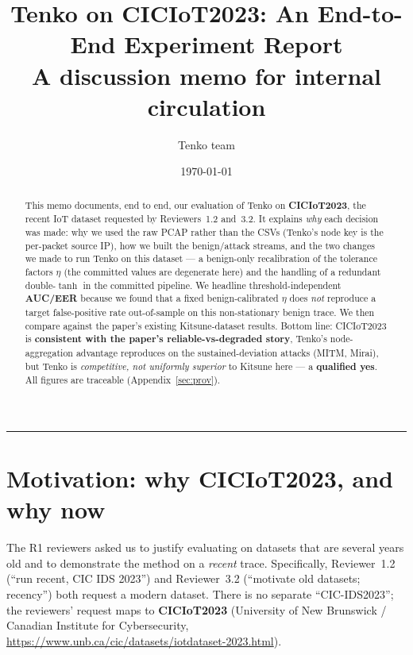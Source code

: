 \documentclass[11pt]{article}
\title{Tenko on CICIoT2023: An End-to-End Experiment Report\\
\large A discussion memo for internal circulation}
\author{Tenko team}
\date{\today}
\begin{document}
\maketitle
\sloppy

\begin{abstract}
This memo documents, end to end, our evaluation of Tenko on \textbf{CICIoT2023}, the
recent IoT dataset requested by Reviewers~1.2 and~3.2. It explains \emph{why} each decision
was made: why we used the raw PCAP rather than the CSVs (Tenko's node key is the per-packet
source IP), how we built the benign/attack streams, and the two changes we made to run Tenko on
this dataset --- a benign-only recalibration of the tolerance factors $\eta$ (the committed
values are degenerate here) and the handling of a redundant double-$\tanh$ in the committed
pipeline. We headline threshold-independent \textbf{AUC/EER} because we found that a fixed
benign-calibrated $\eta$ does \emph{not} reproduce a target false-positive rate out-of-sample on
this non-stationary benign trace. We then compare against the paper's existing Kitsune-dataset
results. Bottom line: CICIoT2023 is \textbf{consistent with the paper's reliable-vs-degraded
story}, Tenko's node-aggregation advantage reproduces on the sustained-deviation attacks
(MITM, Mirai), but Tenko is \emph{competitive, not uniformly superior} to Kitsune here --- a
\textbf{qualified yes}. All figures are traceable (Appendix~\ref{sec:prov}).
\end{abstract}

\tableofcontents
\bigskip
\hrule
\bigskip

\section{Motivation: why CICIoT2023, and why now}
\label{sec:motivation}

The R1 reviewers asked us to justify evaluating on datasets that are several years old and to
demonstrate the method on a \emph{recent} trace. Specifically, Reviewer~1.2 (``run recent, CIC
IDS 2023'') and Reviewer~3.2 (``motivate old datasets; recency'') both request a modern dataset.
There is no separate ``CIC-IDS2023''; the reviewers' request maps to \textbf{CICIoT2023}
(University of New Brunswick / Canadian Institute for Cybersecurity,
\url{https://www.unb.ca/cic/datasets/iotdataset-2023.html}).
\end{document}
